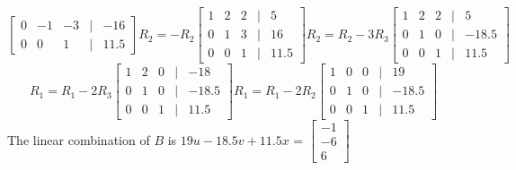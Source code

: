 \documentclass[11pt]{article}
\begin{document}
\begin{enumerate}
\begin{enumerate}
\[\begin{bmatrix}
    0 & -1 & -3 &|& -16 \\
    0 & 0 & 1 &|& 11.5
\end{bmatrix}
R_2 = -R_2
\begin{bmatrix}
    1 & 2 & 2 &|& 5 \\
    0 & 1 & 3 &|& 16 \\
    0 & 0 & 1 &|& 11.5
\end{bmatrix}
R_2 = R_2 - 3R_3
\begin{bmatrix}
    1 & 2 & 2 &|& 5 \\
    0 & 1 & 0 &|& -18.5 \\
    0 & 0 & 1 &|& 11.5
\end{bmatrix}
\]
\[
R_1 = R_1 - 2R_3
\begin{bmatrix}
    1 & 2 & 0 &|& -18 \\
    0 & 1 & 0 &|& -18.5 \\
    0 & 0 & 1 &|& 11.5
\end{bmatrix}
R_1 = R_1 - 2R_2
\begin{bmatrix}
    1 & 0 & 0 &|& 19 \\
    0 & 1 & 0 &|& -18.5 \\
    0 & 0 & 1 &|& 11.5
\end{bmatrix}
\]
The linear combination of \( B \) is \( 19u - 18.5v + 11.5x \) = \(\begin{bmatrix} -1 \\ -6 \\ 6 \end{bmatrix}\)
\end{enumerate}
\end{enumerate}

\vspace{0.5cm} %
\end{document}
